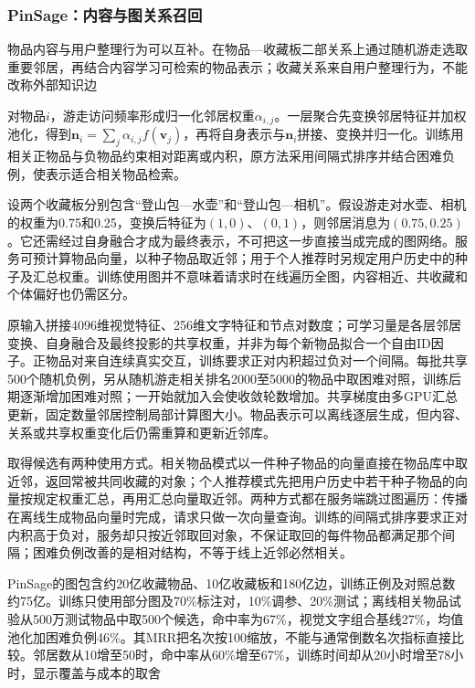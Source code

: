 \subsubsection{PinSage：内容与图关系召回}
\label{sec:rs-pinsage}

物品内容与用户整理行为可以互补。在物品—收藏板二部关系上通过随机游走选取重要邻居，再结合内容学习可检索的物品表示；收藏关系来自用户整理行为，不能改称外部知识边

对物品$i$，游走访问频率形成归一化邻居权重$\alpha_{i,j}$。一层聚合先变换邻居特征并加权池化，得到$\bm n_i=\sum_j\alpha_{i,j}f(\bm v_j)$，再将自身表示与$\bm n_i$拼接、变换并归一化。训练用相关正物品与负物品约束相对距离或内积，原方法采用间隔式排序并结合困难负例，使表示适合相关物品检索。

设两个收藏板分别包含“登山包—水壶”和“登山包—相机”。假设游走对水壶、相机的权重为0.75和0.25，变换后特征为$(1,0)$、$(0,1)$，则邻居消息为$(0.75,0.25)$。它还需经过自身融合才成为最终表示，不可把这一步直接当成完成的图网络。服务可预计算物品向量，以种子物品取近邻；用于个人推荐时另规定用户历史中的种子及汇总权重。训练使用图并不意味着请求时在线遍历全图，内容相近、共收藏和个体偏好也仍需区分。

原输入拼接4096维视觉特征、256维文字特征和节点对数度；可学习量是各层邻居变换、自身融合及最终投影的共享权重，并非为每个新物品拟合一个自由ID因子。正物品对来自连续真实交互，训练要求正对内积超过负对一个间隔。每批共享500个随机负例，另从随机游走相关排名2000至5000的物品中取困难对照，训练后期逐渐增加困难对照；一开始就加入会使收敛轮数增加。共享梯度由多GPU汇总更新，固定数量邻居控制局部计算图大小。物品表示可以离线逐层生成，但内容、关系或共享权重变化后仍需重算和更新近邻库。

取得候选有两种使用方式。相关物品模式以一件种子物品的向量直接在物品库中取近邻，返回常被共同收藏的对象；个人推荐模式先把用户历史中若干种子物品的向量按规定权重汇总，再用汇总向量取近邻。两种方式都在服务端跳过图遍历：传播在离线生成物品向量时完成，请求只做一次向量查询。训练的间隔式排序要求正对内积高于负对，服务却只按近邻取回对象，不保证取回的每件物品都满足那个间隔；困难负例改善的是相对结构，不等于线上近邻必然相关。

PinSage的图包含约20亿收藏物品、10亿收藏板和180亿边，训练正例及对照总数约75亿。训练只使用部分图及70\%标注对，10\%调参、20\%测试；离线相关物品试验从500万测试物品中取500个候选，命中率为67\%，视觉文字组合基线27\%，均值池化加困难负例46\%。其MRR把名次按100缩放，不能与通常倒数名次指标直接比较。邻居数从10增至50时，命中率从60\%增至67\%，训练时间却从20小时增至78小时，显示覆盖与成本的取舍

